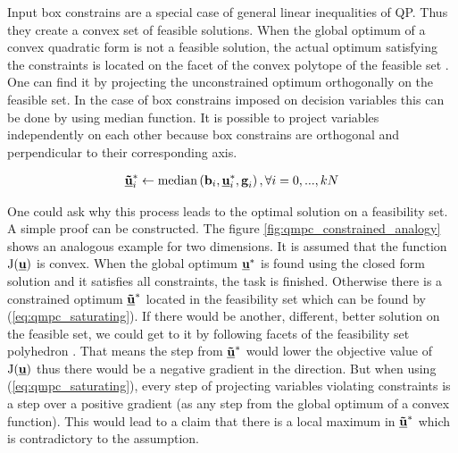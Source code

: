 Input box constrains are a special case of general linear inequalities of QP. Thus they create a convex set of feasible solutions. When the global optimum of a convex quadratic form is not a feasible solution, the actual optimum satisfying the constraints is located on the facet of the convex polytope of the feasible set \citep{boyd2004convex}. One can find it by projecting the unconstrained optimum orthogonally on the feasible set. In the case of box constrains imposed on decision variables this can be done by using $\mathrm{median}$ function. It is possible to project variables independently on each other because box constrains are orthogonal and perpendicular to their corresponding axis.

\begin{equation}
\begin{split}
\label{eq:qmpc_saturating}
\textbf{\underline{\~u}}^*_i \leftarrow \mathrm{median}\left(\textbf{b}_i, \textbf{\underline{u}}^*_i, \textbf{g}_i\right),  \forall i=0,...,kN
\end{split}
\end{equation}

\newcommand{\boundellipse}[3]%
{(#1) ellipse (#2 and #3)
}

One could ask why this process leads to the optimal solution on a feasibility set. A simple proof can be constructed. The figure \ref{fig:qmpc_constrained_analogy} shows an analogous example for two dimensions. It is assumed that the function $\mathrm{J}(\textbf{\underline{u}})$ is convex. When the global optimum $\textbf{\underline{u}}^*$ is found using the closed form solution and it satisfies all constraints, the task is finished. Otherwise there is a constrained optimum $\textbf{\underline{\~u}}^*$ located in the feasibility set which can be found by (\ref{eq:qmpc_saturating}). If there would be another, different, better solution on the feasible set, we could get to it by following facets of the feasibility set polyhedron \citep{boyd2004convex}. That means the step from $\textbf{\underline{\~u}}^*$ would lower the objective value of $\mathrm{J}(\textbf{\underline{u}})$ thus there would be a negative gradient in the direction. But when using (\ref{eq:qmpc_saturating}), every step of projecting variables violating constraints is a step over a positive gradient (as any step from the global optimum of a convex function). This would lead to a claim that there is a local maximum in $\textbf{\underline{\~u}}^*$ which is contradictory to the assumption.

